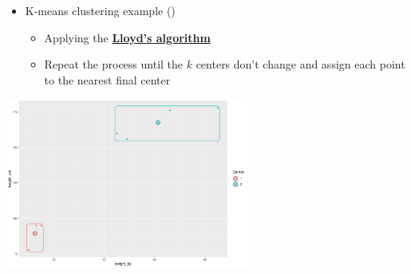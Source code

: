 \documentclass[
  ignorenonframetext,
]{beamer}
\begin{document}
\begin{frame}{}
\label{section-42}
\begin{itemize}
\item
  K-means clustering example
  ()

  \begin{itemize}
  \item
    Applying the
    \href{https://en.wikipedia.org/wiki/K-means_clustering}{\textbf{Lloyd's
    algorithm}}
  \item
    Repeat the process until the \(k\) centers don't change and assign
    each point to the nearest final center
  \end{itemize}
\end{itemize}

\begin{center}
\includegraphics[width=0.6\textwidth,height=\textheight]{011_segmentation_clustering_files/figure-beamer/unnamed-chunk-30-1.pdf}
\end{center}
\end{frame}
\end{document}
